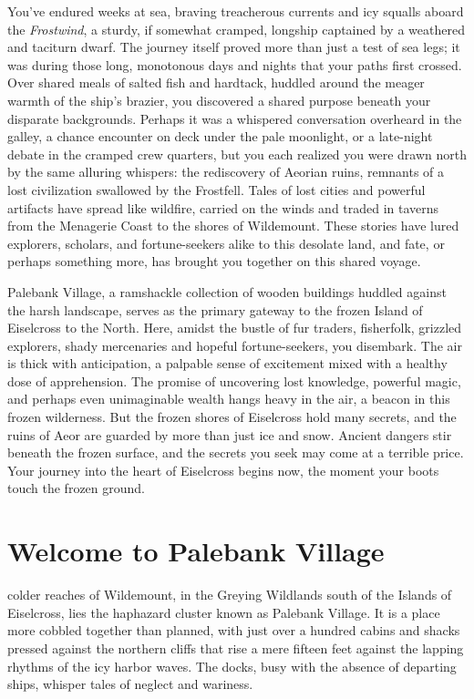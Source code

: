 \documentclass[
  letterpaper,12pt,twoside,twocolumn,openany,
  nodeprecatedcode,bg=full]{dndbook}
\begin{document}
You've endured weeks at sea, braving treacherous currents and icy
squalls aboard the \emph{Frostwind}, a sturdy, if somewhat cramped,
longship captained by a weathered and taciturn dwarf. The journey itself
proved more than just a test of sea legs; it was during those long,
monotonous days and nights that your paths first crossed. Over shared
meals of salted fish and hardtack, huddled around the meager warmth of
the ship's brazier, you discovered a shared purpose beneath your
disparate backgrounds. Perhaps it was a whispered conversation overheard
in the galley, a chance encounter on deck under the pale moonlight, or a
late-night debate in the cramped crew quarters, but you each realized
you were drawn north by the same alluring whispers: the rediscovery of
Aeorian ruins, remnants of a lost civilization swallowed by the
Frostfell. Tales of lost cities and powerful artifacts have spread like
wildfire, carried on the winds and traded in taverns from the Menagerie
Coast to the shores of Wildemount. These stories have lured explorers,
scholars, and fortune-seekers alike to this desolate land, and fate, or
perhaps something more, has brought you together on this shared voyage.

Palebank Village, a ramshackle collection of wooden buildings huddled
against the harsh landscape, serves as the primary gateway to the frozen
Island of Eiselcross to the North. Here, amidst the bustle of fur
traders, fisherfolk, grizzled explorers, shady mercenaries and hopeful
fortune-seekers, you disembark. The air is thick with anticipation, a
palpable sense of excitement mixed with a healthy dose of apprehension.
The promise of uncovering lost knowledge, powerful magic, and perhaps
even unimaginable wealth hangs heavy in the air, a beacon in this frozen
wilderness. But the frozen shores of Eiselcross hold many secrets, and
the ruins of Aeor are guarded by more than just ice and snow. Ancient
dangers stir beneath the frozen surface, and the secrets you seek may
come at a terrible price. Your journey into the heart of Eiselcross
begins now, the moment your boots touch the frozen ground.

\chapter{Welcome to Palebank Village}\label{welcome-to-palebank-village}

 colder reaches of
Wildemount, in the Greying Wildlands south of the Islands of Eiselcross,
lies the haphazard cluster known as Palebank Village. It is a place more
cobbled together than planned, with just over a hundred cabins and
shacks pressed against the northern cliffs that rise a mere fifteen feet
against the lapping rhythms of the icy harbor waves. The docks, busy
with the absence of departing ships, whisper tales of neglect and
wariness.
\end{document}
